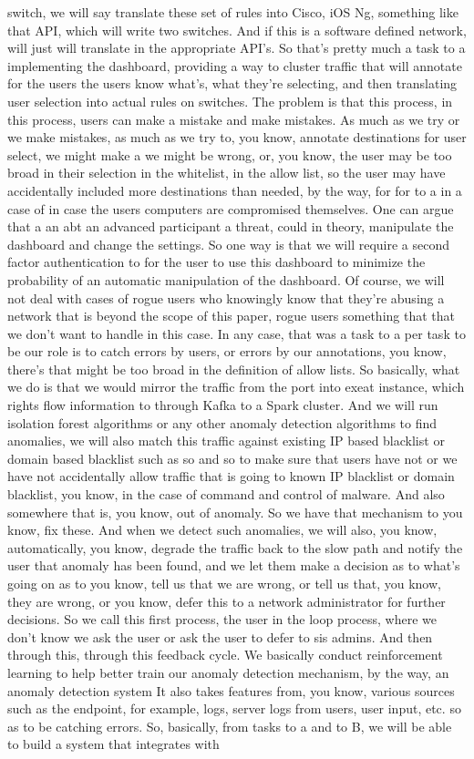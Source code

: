 switch, we will say translate these set of rules into Cisco, iOS Ng, something like that API, which will write two switches. And if this is a software defined network, will just will translate in the appropriate API's. So that's pretty much a task to a implementing the dashboard, providing a way to cluster traffic that will annotate for the users the users know what's, what they're selecting, and then translating user selection into actual rules on switches. The problem is that this process, in this process, users can make a mistake and make mistakes. As much as we try or we make mistakes, as much as we try to, you know, annotate destinations for user select, we might make a we might be wrong, or, you know, the user may be too broad in their selection in the whitelist, in the allow list, so the user may have accidentally included more destinations than needed, by the way, for for to a in a case of in case the users computers are compromised themselves. One can argue that a an abt an advanced participant a threat, could in theory, manipulate the dashboard and change the settings. So one way is that we will require a second factor authentication to for the user to use this dashboard to minimize the probability of an automatic manipulation of the dashboard. Of course, we will not deal with cases of rogue users who knowingly know that they're abusing a network that is beyond the scope of this paper, rogue users something that that we don't want to handle in this case. In any case, that was a task to a per task to be our role is to catch errors by users, or errors by our annotations, you know, there's that might be too broad in the definition of allow lists. So basically, what we do is that we would mirror the traffic from the port into exeat instance, which rights flow information to through Kafka to a Spark cluster. And we will run isolation forest algorithms or any other anomaly detection algorithms to find anomalies, we will also match this traffic against existing IP based blacklist or domain based blacklist such as so and so to make sure that users have not or we have not accidentally allow traffic that is going to known IP blacklist or domain blacklist, you know, in the case of command and control of malware. And also somewhere that is, you know, out of anomaly. So we have that mechanism to you know, fix these. And when we detect such anomalies, we will also, you know, automatically, you know, degrade the traffic back to the slow path and notify the user that anomaly has been found, and we let them make a decision as to what's going on as to you know, tell us that we are wrong, or tell us that, you know, they are wrong, or you know, defer this to a network administrator for further decisions. So we call this first process, the user in the loop process, where we don't know we ask the user or ask the user to defer to sis admins. And then through this, through this feedback cycle. We basically conduct reinforcement learning to help better train our anomaly detection mechanism, by the way, an anomaly detection system It also takes features from, you know, various sources such as the endpoint, for example, logs, server logs from users, user input, etc. so as to be catching errors. So, basically, from tasks to a and to B, we will be able to build a system that integrates with 